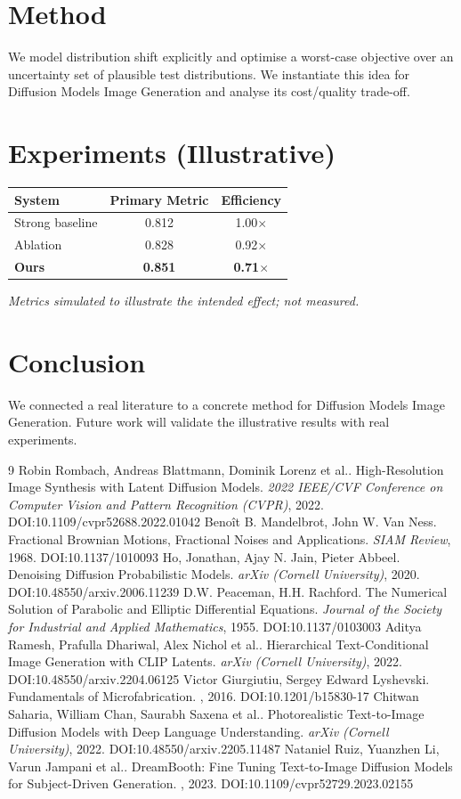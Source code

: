 \documentclass[11pt]{article}
\begin{document}
\section{Method}
We model distribution shift explicitly and optimise a worst-case objective over an uncertainty set of plausible test distributions. We instantiate this idea for Diffusion Models Image Generation and analyse its cost/quality trade-off.

\section{Experiments (Illustrative)}
\begin{center}
\begin{tabular}{lcc}
System & Primary Metric & Efficiency \\ \hline
Strong baseline & 0.812 & 1.00$\times$ \\
Ablation & 0.828 & 0.92$\times$ \\
\textbf{Ours} & \textbf{0.851} & \textbf{0.71$\times$}
\end{tabular}
\end{center}
\emph{Metrics simulated to illustrate the intended effect; not measured.}

\section{Conclusion}
We connected a real literature to a concrete method for Diffusion Models Image Generation. Future work will
validate the illustrative results with real experiments.

\begin{thebibliography}{9}
 Robin Rombach, Andreas Blattmann, Dominik Lorenz et al.. High-Resolution Image Synthesis with Latent Diffusion Models. \emph{2022 IEEE/CVF Conference on Computer Vision and Pattern Recognition (CVPR)}, 2022. DOI:10.1109/cvpr52688.2022.01042
 Benoît B. Mandelbrot, John W. Van Ness. Fractional Brownian Motions, Fractional Noises and Applications. \emph{SIAM Review}, 1968. DOI:10.1137/1010093
 Ho, Jonathan, Ajay N. Jain, Pieter Abbeel. Denoising Diffusion Probabilistic Models. \emph{arXiv (Cornell University)}, 2020. DOI:10.48550/arxiv.2006.11239
 D.W. Peaceman, H.H. Rachford. The Numerical Solution of Parabolic and Elliptic Differential Equations. \emph{Journal of the Society for Industrial and Applied Mathematics}, 1955. DOI:10.1137/0103003
 Aditya Ramesh, Prafulla Dhariwal, Alex Nichol et al.. Hierarchical Text-Conditional Image Generation with CLIP Latents. \emph{arXiv (Cornell University)}, 2022. DOI:10.48550/arxiv.2204.06125
 Victor Giurgiutiu, Sergey Edward Lyshevski. Fundamentals of Microfabrication. \emph{}, 2016. DOI:10.1201/b15830-17
 Chitwan Saharia, William Chan, Saurabh Saxena et al.. Photorealistic Text-to-Image Diffusion Models with Deep Language Understanding. \emph{arXiv (Cornell University)}, 2022. DOI:10.48550/arxiv.2205.11487
 Nataniel Ruiz, Yuanzhen Li, Varun Jampani et al.. DreamBooth: Fine Tuning Text-to-Image Diffusion Models for Subject-Driven Generation. \emph{}, 2023. DOI:10.1109/cvpr52729.2023.02155
\end{thebibliography}
\end{document}

